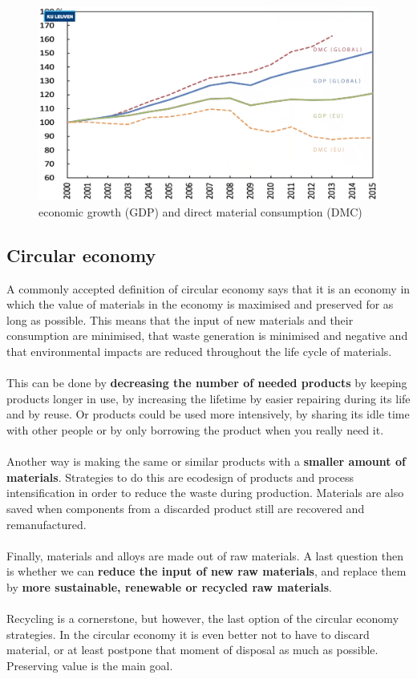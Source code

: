 \documentclass[../summary.tex]{subfiles}
\begin{document}
	\begin{figure}[H]
		\centering
		\includegraphics[width=0.8\linewidth]{../images/5-GDP-DMC-GLOBAL-EU}
		\caption{economic growth (GDP) and direct material consumption (DMC)}
		\label{fig:5-gdp-dmc-global-eu}
	\end{figure}
	
	\newpage
	\subsection{Circular economy}
	
	A commonly accepted definition of circular economy says that it is an economy in which the value of materials in the economy is maximised and preserved for as long as possible. This means that the input of new materials and their consumption are minimised, that waste generation is minimised and negative and that environmental impacts are reduced throughout the life cycle of materials. 
	\\\\
	This can be done by \textbf{decreasing the number of needed products} by keeping products longer in use, by increasing the lifetime by easier repairing during its life and by reuse. Or products could be used more intensively, by sharing its idle time with other people or by only borrowing the product when you really need it.
	\\\\
	Another way is making the same or similar products with a \textbf{smaller amount of materials}. Strategies to do this are ecodesign of products and process intensification in order to reduce the waste during production. Materials are also saved when components from a discarded product still are recovered and remanufactured.
	\\\\
	Finally, materials and alloys are made out of raw materials. A last question then is whether we can \textbf{reduce the input of new raw materials}, and replace them by \textbf{more sustainable, renewable or recycled raw materials}. 
	\\\\
	Recycling is a cornerstone, but however, the last option of the circular economy strategies. In the circular economy it is even better not to have to discard material, or at least postpone that moment of disposal as much as possible. Preserving value is the main goal.
	
\end{document}
